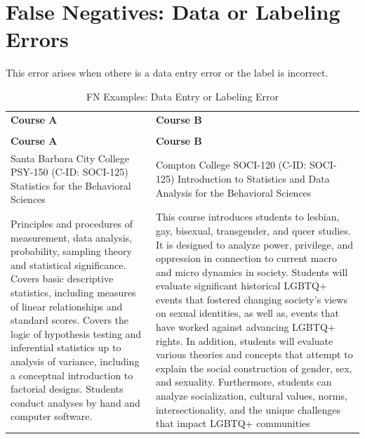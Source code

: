 \section{False Negatives: Data or Labeling Errors}\label{app:labelerror}
This error arises when othere is a data entry error or the label is incorrect.

{
\renewcommand{\arraystretch}{0.5}    
\begin{longtable}{ >{\baselineskip=12pt}p{}  >{\baselineskip=12pt}p{} }
\captionsetup{skip=5pt}
\caption{FN Examples: Data Entry or Labeling Error}\label{tab:fn_entry}\\
\bottomrule\toprule
\textbf{Course A} & \textbf{Course B} \\
\bottomrule\toprule
\endfirsthead
\caption[]{FN Examples: Data Entry or Labeling Error}\\
\bottomrule\toprule
\textbf{Course A} & \textbf{Course B} \\
\bottomrule\toprule
\endhead
Santa Barbara City College \newline PSY-150 (C-ID: SOCI-125) \newline Statistics for the Behavioral Sciences & Compton College \newline SOCI-120 (C-ID: SOCI-125) \newline Introduction to Statistics and Data Analysis for the Behavioral Sciences \\
\midrule
Principles and procedures of measurement, data analysis, probability, sampling theory and statistical significance. Covers basic descriptive statistics, including measures of linear relationships and standard scores. Covers the logic of hypothesis testing and inferential statistics up to analysis of variance, including a conceptual introduction to factorial designs. Students conduct analyses by hand and computer software. & This course introduces students to lesbian, gay, bisexual, transgender, and queer studies. It is designed to analyze power, privilege, and oppression in connection to current macro and micro dynamics in society. Students will evaluate significant historical LGBTQ+ events that fostered changing society's views on sexual identities, as well as, events that have worked against advancing LGBTQ+ rights. In addition, students will evaluate various theories and concepts that attempt to explain the social construction of gender, sex, and sexuality. Furthermore, students can analyze socialization, cultural values, norms, intersectionality, and the unique challenges that impact LGBTQ+ communities\\
\bottomrule\toprule
\end{longtable}}


